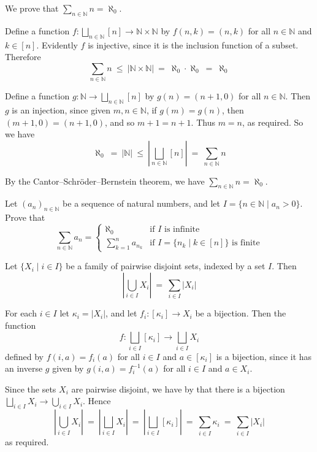 \begin{example}
We prove that $\displaystyle \sum_{n \in \mathbb{N}} n = \aleph_0$.

Define a function $f : \displaystyle \bigsqcup_{n \in \mathbb{N}} [n] \to \mathbb{N} \times \mathbb{N}$ by $f(n,k) = (n,k)$ for all $n \in \mathbb{N}$ and $k \in [n]$. Evidently $f$ is injective, since it is the inclusion function of a subset. Therefore
\[ \sum_{n \in \mathbb{N}} n ~\le~ |\mathbb{N} \times \mathbb{N}| ~=~ \aleph_0 \cdot \aleph_0 ~=~ \aleph_0 \]

Define a function $g : \mathbb{N} \to \displaystyle \bigsqcup_{n \in \mathbb{N}} [n]$ by $g(n) = (n+1, 0)$ for all $n \in \mathbb{N}$. Then $g$ is an injection, since given $m,n \in \mathbb{N}$, if $g(m)=g(n)$, then $(m+1,0) = (n+1,0)$, and so $m+1=n+1$. Thus $m=n$, as required. So we have
\[ \aleph_0 ~=~ |\mathbb{N}| ~\le~ \left| \bigsqcup_{n \in \mathbb{N}} [n] \right| ~=~ \sum_{n \in \mathbb{N}} n \]

By the Cantor--Schr\"{o}der--Bernstein theorem, we have $\sum_{n \in \mathbb{N}} n = \aleph_0$.
\end{example}

\begin{exercise}
Let $(a_n)_{n \in \mathbb{N}}$ be a sequence of natural numbers, and let $I = \{ n \in \mathbb{N} \mid a_n > 0 \}$. Prove that
\[ \sum_{n \in \mathbb{N}} a_n = \begin{cases} \aleph_0 & \text{if $I$ is infinite} \\ \sum_{k=1}^n a_{n_k} & \text{if $I = \{ n_k \mid k \in [n] \}$ is finite} \end{cases} \]
\end{exercise}

\begin{lemma}
Let $\{ X_i \mid i \in I \}$ be a family of pairwise disjoint sets, indexed by a set $I$. Then
\[ \left| \bigcup_{i \in I} X_i \right| ~=~ \sum_{i \in I} |X_i| \]
\end{lemma}

\begin{cproof}
For each $i \in I$ let $\kappa_i = |X_i|$, and let $f_i : [\kappa_i] \to X_i$ be a bijection. Then the function
\[ f : \bigsqcup_{i \in I} [\kappa_i] \to \bigsqcup_{i \in I} X_i \]
defined by $f(i,a) = f_i(a)$ for all $i \in I$ and $a \in [\kappa_i]$ is a bijection, since it has an inverse $g$ given by $g(i,a) = f_i^{-1}(a)$ for all $i \in I$ and $a \in X_i$.

Since the sets $X_i$ are pairwise disjoint, we have by  that there is a bijection $\displaystyle \bigsqcup_{i \in I} X_i \to \bigcup_{i \in I} X_i$. Hence
\[ \left| \bigcup_{i \in I} X_i \right| ~=~ \left| \bigsqcup_{i \in I} X_i \right| ~=~ \left| \bigsqcup_{i \in I} [\kappa_i] \right| ~=~ \sum_{i \in I} \kappa_i ~=~ \sum_{i \in I} |X_i| \]
as required.
\end{cproof}

